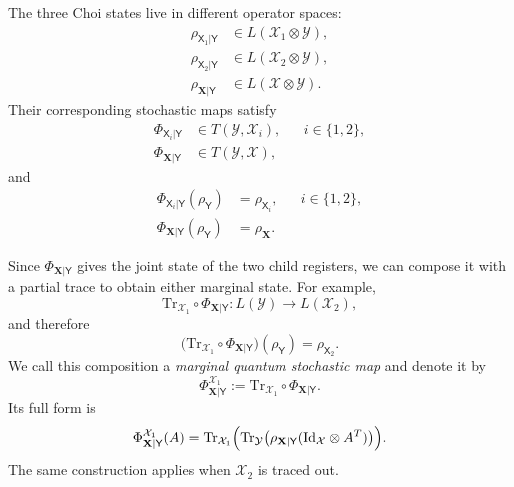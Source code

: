\documentclass[
    aps,
    pra,
    reprint,
    superscriptaddress,
    nofootinbib
]{revtex4-2}
\theoremstyle{definition}
\theoremstyle{plain}
\begin{document}
The three Choi states live in different operator spaces:
\begin{align}
    \rho_{\mathsf{X}_{1}|\mathsf{Y}}
    &\in L(\mathcal{X}_{1}\otimes\mathcal{Y}),\\
    \rho_{\mathsf{X}_{2}|\mathsf{Y}}
    &\in L(\mathcal{X}_{2}\otimes\mathcal{Y}),\\
    \rho_{\mathbf{X}|\mathsf{Y}}
    &\in L(\mathcal{X}\otimes\mathcal{Y}).
\end{align}
Their corresponding stochastic maps satisfy
\begin{equation}
    \begin{aligned}
    \Phi_{\mathsf{X}_{i}|\mathsf{Y}}
    &\in T(\mathcal{Y},\mathcal{X}_{i}),
    &&i\in\{1,2\},\\
    \Phi_{\mathbf{X}|\mathsf{Y}}
    &\in T(\mathcal{Y},\mathcal{X}),
    \end{aligned}
\end{equation}
and
\begin{align}
    \Phi_{\mathsf{X}_{i}|\mathsf{Y}}(\rho_{\mathsf{Y}})
    &=
    \rho_{\mathsf{X}_{i}},
    &&i\in\{1,2\},\\
    \Phi_{\mathbf{X}|\mathsf{Y}}(\rho_{\mathsf{Y}})
    &=
    \rho_{\mathbf{X}}.
\end{align}

Since $\Phi_{\mathbf{X}|\mathsf{Y}}$ gives the joint state of the two child
registers, we can compose it with a partial trace to obtain either marginal
state. For example,
\begin{equation}
    \mathrm{Tr}_{\mathcal{X}_{1}}
    \circ\Phi_{\mathbf{X}|\mathsf{Y}}:
    L(\mathcal{Y})
    \to
    L(\mathcal{X}_{2}),
\end{equation}
and therefore
\begin{equation}
    \bigl(
        \mathrm{Tr}_{\mathcal{X}_{1}}
        \circ\Phi_{\mathbf{X}|\mathsf{Y}}
    \bigr)(\rho_{\mathsf{Y}})
    =
    \rho_{\mathsf{X}_{2}}.
\end{equation}
We call this composition a \emph{marginal quantum stochastic map} and
denote it by
\begin{equation}
    \Phi_{\mathbf{X}|\mathsf{Y}}^{\mathcal{X}_{1}}
    :=
    \mathrm{Tr}_{\mathcal{X}_{1}}
    \circ\Phi_{\mathbf{X}|\mathsf{Y}}.
\end{equation}
Its full form is
\begin{equation}
    \Phi_{\mathbf{X}|\mathsf{Y}}^{\mathcal{X}_{1}}(A)
    =
    \mathrm{Tr}_{\mathcal{X}_{1}}
    \Bigl(
        \mathrm{Tr}_{\mathcal{Y}}
        \bigl(
            \rho_{\mathbf{X}|\mathsf{Y}}(\mathrm{Id}_{\mathcal{X}}\otimes A^{T})
        \bigr)
    \Bigr).
\end{equation}
The same construction applies when $\mathcal{X}_{2}$ is traced out.
\end{document}
